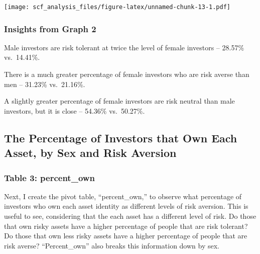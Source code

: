 \documentclass[
]{article}
\begin{document}
\texttt{[image: scf\_analysis\_files/figure-latex/unnamed-chunk-13-1.pdf]}

\hypertarget{insights-from-graph-2}{%
\subsubsection{Insights from Graph 2}\label{insights-from-graph-2}}

Male investors are risk tolerant at twice the level of female investors
-- 28.57\% vs.~14.41\%.

There is a much greater percentage of female investors who are risk
averse than men -- 31.23\% vs.~21.16\%.

A slightly greater percentage of female investors are risk neutral than
male investors, but it is close -- 54.36\% vs.~50.27\%.

\hypertarget{the-percentage-of-investors-that-own-each-asset-by-sex-and-risk-aversion}{%
\subsection{The Percentage of Investors that Own Each Asset, by Sex and
Risk
Aversion}\label{the-percentage-of-investors-that-own-each-asset-by-sex-and-risk-aversion}}

\hypertarget{table-3-percent_own}{%
\subsubsection{Table 3: percent\_own}\label{table-3-percent_own}}

Next, I create the pivot table, ``percent\_own,'' to observe what
percentage of investors who own each asset identity as different levels
of risk aversion. This is useful to see, considering that the each asset
has a different level of risk. Do those that own risky assets have a
higher percentage of people that are risk tolerant? Do those that own
less risky assets have a higher percentage of people that are risk
averse? ``Percent\_own'' also breaks this information down by sex.
\end{document}
